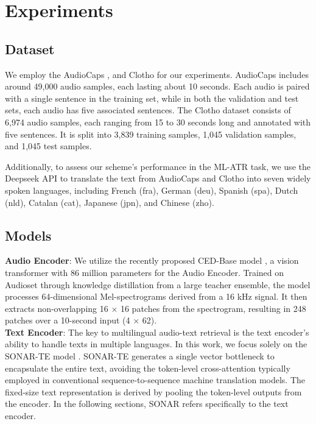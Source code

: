 \section{Experiments}
\subsection{Dataset}
We employ the AudioCaps \cite{kim2019audiocaps}, and Clotho \cite{drossos2020clotho} for our experiments. AudioCaps includes around 49,000 audio samples, each lasting about 10 seconds. Each audio is paired with a single sentence in the training set, while in both the validation and test sets, each audio has five associated sentences. The Clotho dataset consists of 6,974 audio samples, each ranging from 15 to 30 seconds long and annotated with five sentences. It is split into 3,839 training samples, 1,045 validation samples, and 1,045 test samples. 

Additionally, to assess our scheme's performance in the ML-ATR task, we use the Deepseek \cite{bi2024deepseek} API to translate the text from AudioCaps and Clotho into seven widely spoken languages, including French (fra), German (deu), Spanish (spa), Dutch (nld), Catalan (cat), Japanese (jpn), and Chinese (zho).

\subsection{Models}
\textbf{Audio Encoder}: 
We utilize the recently proposed CED-Base model \cite{dinkel2024ced}, a vision transformer with 86 million parameters for the Audio Encoder. Trained on Audioset through knowledge distillation from a large teacher ensemble, the model processes 64-dimensional Mel-spectrograms derived from a 16 kHz signal. It then extracts non-overlapping 16 × 16 patches from the spectrogram, resulting in 248 patches over a 10-second input (4 × 62).
\\
\textbf{Text Encoder}:
The key to multilingual audio-text retrieval is the text encoder's ability to handle texts in multiple languages. In this work, we focus solely on the SONAR-TE model \cite{duquenne2023sonar}. SONAR-TE generates a single vector bottleneck to encapsulate the entire text, avoiding the token-level cross-attention typically employed in conventional sequence-to-sequence machine translation models. The fixed-size text representation is derived by pooling the token-level outputs from the encoder. In the following sections, SONAR refers specifically to the text encoder.

